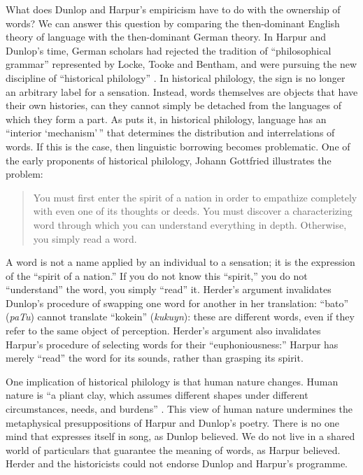 \documentclass[
  Crown,
  times,
  sageh]{sagej}
\begin{document}
What does Dunlop and Harpur's empiricism have to do with the ownership
of words? We can answer this question by comparing the then-dominant
English theory of language with the then-dominant German theory. In
Harpur and Dunlop's time, German scholars had rejected the tradition of
``philosophical grammar'' represented by Locke, Tooke and Bentham, and
were pursuing the new discipline of ``historical philology''
\citetext{\citealp[xii]{foucault_order_2002}; \citealp[3-6]{aarsleff_study_1967}}.
In historical philology, the sign is no longer an arbitrary label for a
sensation. Instead, words themselves are objects that have their own
histories, can they cannot simply be detached from the languages of
which they form a part. As \citet[256]{foucault_order_2002} puts it, in
historical philology, language has an ``interior `mechanism'\,'' that
determines the distribution and interrelations of words. If this is the
case, then linguistic borrowing becomes problematic. One of the early
proponents of historical philology, Johann Gottfried
\citet[38-39]{herder_against_1993} illustrates the problem:

\begin{quote}
You must first enter the spirit of a nation in order to empathize
completely with even one of its thoughts or deeds. You must discover a
characterizing word through which you can understand everything in
depth. Otherwise, you simply read a word.
\end{quote}

A word is not a name applied by an individual to a sensation; it is the
expression of the ``spirit of a nation.'' If you do not know this
``spirit,'' you do not ``understand'' the word, you simply ``read'' it.
Herder's argument invalidates Dunlop's procedure of swapping one word
for another in her translation: ``bato'' (\emph{paTu}) cannot translate
``kokein'' (\emph{kukuyn}): these are different words, even if they
refer to the same object of perception. Herder's argument also
invalidates Harpur's procedure of selecting words for their
``euphoniousness:'' Harpur has merely ``read'' the word for its sounds,
rather than grasping its spirit.

One implication of historical philology is that human nature changes.
Human nature is ``a pliant clay, which assumes different shapes under
different circumstances, needs, and burdens''
\citep[43]{herder_against_1993}. This view of human nature undermines
the metaphysical presuppositions of Harpur and Dunlop's poetry. There is
no one mind that expresses itself in song, as Dunlop believed. We do not
live in a shared world of particulars that guarantee the meaning of
words, as Harpur believed. Herder and the historicists could not endorse
Dunlop and Harpur's programme.
\end{document}
